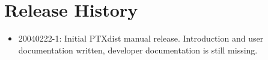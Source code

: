 \chapter{Release History}

\begin{itemize}
\item 20040222-1: Initial PTXdist manual release. Introduction and user
      documentation written, developer documentation is still missing. 
\end{itemize}

